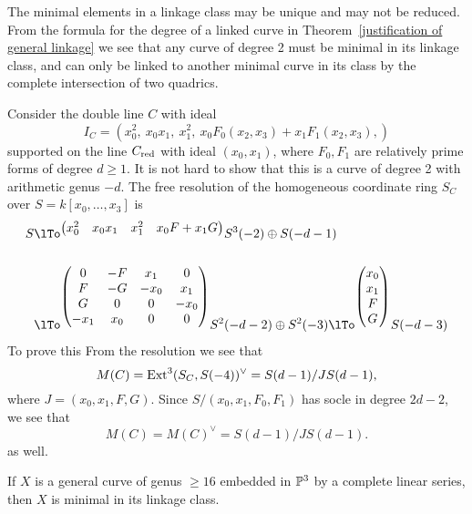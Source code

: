 \begin{example} \label{double lines of higher genus}
The minimal elements in a linkage class may be unique and may not be reduced. From the formula
for the degree of a linked curve in Theorem~\ref{justification of general linkage} we see that
any curve of degree 2 must be minimal in its linkage class, and can only be linked to another 
minimal curve in its class by the complete intersection of two quadrics.

Consider the double line $C$ with ideal 
$$
I_{C}= (x_{0}^{2},\ x_0x_1,\ x_{1}^{2},\ x_{0}F_{0}(x_{2},x_{3})+x_{1}F_{1}(x_{2},x_{3}), )
$$
supported on the line $C_{\red}$ with ideal $(x_{0}, x_{1})$, where $F_{0}, F_{1}$ are relatively prime forms
of degree $d\geq 1$. It is not hard to show that this is a curve of degree 2 with arithmetic genus $-d$.
The free resolution of the homogeneous coordinate ring $S_C$ over $S = k[x_0,\dots,x_3]$ is
\begin{align*}
 S&\lTo^{
\begin{pmatrix}
x_0^2&x_0x_1&x_1^2&x_0F+x_1G
\end{pmatrix}
}
S^3(-2)\oplus S(-d-1)
\\ \\
&
\lTo^{
\begin{pmatrix}
0&-F&x_1&0\\
F&-G&-x_0&x_1\\
G&0&0&-x_0\\
-x_1&x_0&0&0
\end{pmatrix}
}
S^2(-d-2)\oplus S^2(-3)
\lTo^{
\begin{pmatrix}
 x_0\\
 x_1\\
 F\\
 G
 \end{pmatrix}
}
S(-d-3)
\end{align*}
To prove this \fix{****}
From the resolution we
see that 
$$
M(C) = \Ext^3(S_C, S(-4))^\vee = S(d-1)/JS(d-1),
$$
where $J = (x_0,x_1,F,G)$. Since $S/(x_{0}, x_{1}, F_{0}, F_{1})$ has socle in degree $2d-2$, we see that 
$$
M(C) = M(C)^\vee = S(d-1)/JS(d-1).
$$
as well.
\end{example}


\begin{theorem}
If $X$ is a general curve of genus $\geq 16$ embedded in $\PP^3$ by a complete linear series,
then $X$ is minimal in its linkage class.
\end{theorem}


